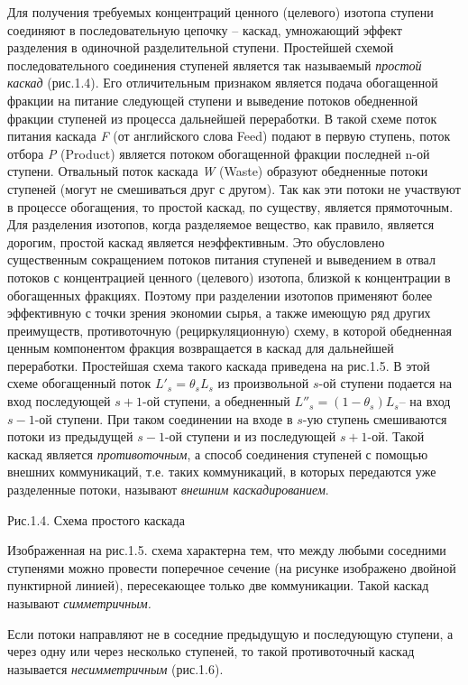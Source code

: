 Для получения требуемых концентраций ценного (целевого) изотопа ступени соединяют в последовательную цепочку -- каскад, умножающий эффект разделения в одиночной разделительной ступени. Простейшей схемой последовательного соединения ступеней является так называемый \textit{простой каскад} (рис.1.4). Его отличительным признаком является подача обогащенной фракции на питание следующей ступени и выведение потоков обедненной фракции ступеней из процесса дальнейшей переработки. В такой схеме поток питания каскада \textit{F} (от английского слова Feed) подают в первую ступень, поток отбора \textit{P} (Product) является потоком обогащенной фракции последней n-ой ступени. Отвальный поток каскада \textit{W} (Waste) образуют обедненные потоки ступеней (могут не смешиваться друг с другом). Так как эти потоки не участвуют в процессе обогащения, то простой каскад, по существу, является прямоточным. Для разделения изотопов, когда разделяемое вещество, как правило, является дорогим, простой каскад является неэффективным. Это обусловлено существенным сокращением потоков питания ступеней и выведением в отвал потоков с концентрацией ценного (целевого) изотопа, близкой к концентрации в обогащенных фракциях. Поэтому при разделении изотопов применяют более эффективную с точки зрения экономии сырья, а также  имеющую ряд других преимуществ, противоточную (рециркуляционную) схему, в которой обедненная ценным компонентом фракция возвращается в каскад для дальнейшей переработки. Простейшая схема такого каскада приведена на рис.1.5. В этой схеме обогащенный поток $L'_{s} =\theta _{s} L_{s} $ из произвольной $s$-ой ступени подается на вход последующей $s+1$-ой ступени, а обедненный $L''_{s} =(1-\theta _{s} )L_{s} $-- на вход $s-1$-ой ступени. При таком соединении на входе в $s$-ую ступень смешиваются потоки из предыдущей $s-1$-ой ступени и из последующей $s+1$-ой. Такой каскад является \textit{противоточным}, а способ соединения ступеней с помощью внешних коммуникаций, т.е. таких коммуникаций, в которых передаются уже разделенные потоки, называют\textit{ внешним каскадированием}.

Рис.1.4. Схема простого каскада


Изображенная на рис.1.5. схема характерна тем, что между любыми соседними ступенями можно провести поперечное сечение (на рисунке изображено двойной пунктирной линией), пересекающее только две коммуникации. Такой каскад называют \textit{симметричным.}

Если потоки направляют не в соседние предыдущую и последующую ступени, а через одну или через несколько ступеней, то такой противоточный каскад называется \textit{несимметричным} (рис.1.6).


